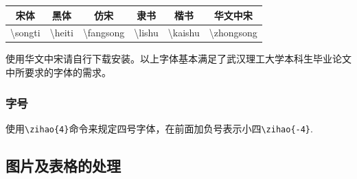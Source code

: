 \begin{table}[htbp]
\begin{center}
\begin{tabular}{cccccc}
\toprule 
 { 宋体} & { 黑体} & { 仿宋} & { 隶书} & {楷书} &{华文中宋}\\ 
\midrule 
\textbackslash songti &\textbackslash  heiti  & \textbackslash fangsong & \textbackslash lishu & \textbackslash kaishu & \textbackslash zhongsong\\ 
\bottomrule 
\end{tabular}  
\end{center}
\end{table}
使用华文中宋请自行下载安装。以上字体基本满足了武汉理工大学本科生毕业论文中所要求的字体的需求。


\subsubsection{字号}
使用\verb|\zihao{4}|命令来规定四号字体，在前面加负号表示小四\verb|\zihao{-4}|.
\subsection{图片及表格的处理}

